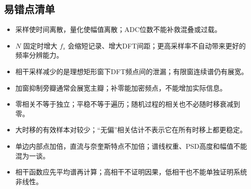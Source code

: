 \subsection*{易错点清单}
\begin{itemize}
\item 采样使时间离散，量化使幅值离散；ADC位数不能补救混叠或过载。
\item $N$ 固定时增大 $f_s$ 会缩短记录、增大DFT间距；更高采样率不自动带来更好的频率分辨能力。
\item 相干采样减少的是理想矩形窗下DFT频点间的泄漏；有限窗连续谱仍有展宽。
\item 加窗抑制旁瓣通常会展宽主瓣；补零能加密频点，不能增加实际信息。
\item 零相关不等于独立；平稳不等于遍历；随机过程的相关也不必随时移衰减到零。
\item 大时移的有效样本对较少；“无偏”相关估计不表示它在所有时移上都更稳定。
\item 单边内部点加倍，直流与奈奎斯特点不加倍；谱线权重、PSD高度和幅值不能混为一谈。
\item 相干函数应先平均谱再计算；高相干不证明因果，低相干也不能单独证明系统非线性。
\end{itemize}

